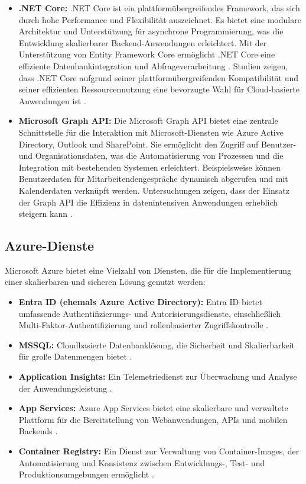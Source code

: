 \begin{itemize}
    \item \textbf{.NET Core:}  
    .NET Core ist ein plattformübergreifendes Framework, das sich durch hohe Performance und Flexibilität auszeichnet. Es bietet eine modulare Architektur und Unterstützung für asynchrone Programmierung, was die Entwicklung skalierbarer Backend-Anwendungen erleichtert. Mit der Unterstützung von Entity Framework Core ermöglicht .NET Core eine effiziente Datenbankintegration und Abfrageverarbeitung \cite{microsoftDotNet}. Studien zeigen, dass .NET Core aufgrund seiner plattformübergreifenden Kompatibilität und seiner effizienten Ressourcennutzung eine bevorzugte Wahl für Cloud-basierte Anwendungen ist \cite{dotNetPerformance2021}.

    \item \textbf{Microsoft Graph API:}  
    Die Microsoft Graph API bietet eine zentrale Schnittstelle für die Interaktion mit Microsoft-Diensten wie Azure Active Directory, Outlook und SharePoint. Sie ermöglicht den Zugriff auf Benutzer- und Organisationsdaten, was die Automatisierung von Prozessen und die Integration mit bestehenden Systemen erleichtert. Beispielsweise können Benutzerdaten für Mitarbeitendengespräche dynamisch abgerufen und mit Kalenderdaten verknüpft werden. Untersuchungen zeigen, dass der Einsatz der Graph API die Effizienz in datenintensiven Anwendungen erheblich steigern kann \cite{microsoftGraphAPI, smith2021graph}.
\end{itemize}


\subsection*{Azure-Dienste}
Microsoft Azure bietet eine Vielzahl von Diensten, die für die Implementierung einer skalierbaren und sicheren Lösung genutzt werden:
\begin{itemize}
    \item \textbf{Entra ID (ehemals Azure Active Directory):}  
    Entra ID bietet umfassende Authentifizierungs- und Autorisierungsdienste, einschließlich Multi-Faktor-Authentifizierung und rollenbasierter Zugriffskontrolle \cite{microsoftEntraID, woods2020authentication}.
    \item \textbf{MSSQL:}  
    Cloudbasierte Datenbanklösung, die Sicherheit und Skalierbarkeit für große Datenmengen bietet \cite{azureDocumentation}.
    \item \textbf{Application Insights:}  
    Ein Telemetriedienst zur Überwachung und Analyse der Anwendungsleistung \cite{microsoftAppInsights, li2021monitoring}.
    \item \textbf{App Services:}  
    Azure App Services bietet eine skalierbare und verwaltete Plattform für die Bereitstellung von Webanwendungen, APIs und mobilen Backends \cite{azureAppServices, thomas2021azure}.
    \item \textbf{Container Registry:}  
    Ein Dienst zur Verwaltung von Container-Images, der Automatisierung und Konsistenz zwischen Entwicklungs-, Test- und Produktionsumgebungen ermöglicht \cite{azureContainerRegistry, dockerContainers2020}.
\end{itemize}

